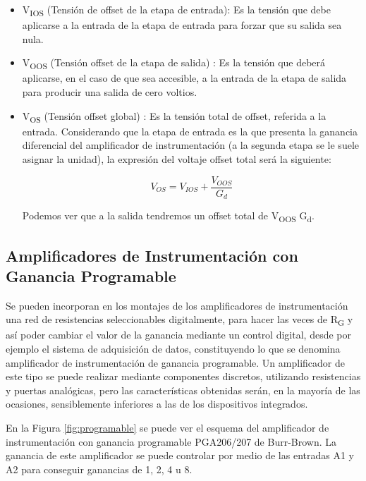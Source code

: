 \begin{itemize}
\item V\textsubscript{IOS} (Tensión de offset de la etapa de entrada): Es la tensión que debe aplicarse a la entrada de la etapa de entrada para forzar que su salida sea nula.
\item V\textsubscript{OOS} (Tensión offset de la etapa de salida) : Es la tensión que deberá aplicarse, en el caso de que sea accesible, a la entrada de la etapa de salida para producir una salida de cero voltios.
\item  V\textsubscript{OS} (Tensión offset global) : Es la tensión total de offset, referida a la entrada. Considerando que la etapa de entrada es la que presenta la ganancia diferencial del amplificador de instrumentación (a la segunda etapa se le suele asignar la unidad), la expresión del voltaje offset total será la siguiente:

\begin{equation}\label{eq7}
V_{OS} = V_{IOS} + \frac{V_{OOS}}{G_d}
\end{equation}

Podemos ver que a la salida tendremos un offset total de V\textsubscript{OOS} G\textsubscript{d}.
\end{itemize}



\subsection{Amplificadores de Instrumentación con Ganancia Programable} %
\label{ganancia_programable}

Se pueden incorporan en los montajes de los amplificadores de instrumentación una red de resistencias seleccionables digitalmente, para hacer las veces de R\textsubscript{G} y así poder cambiar el valor de la ganancia mediante un control digital, desde por ejemplo el sistema de adquisición de datos, constituyendo lo que se denomina amplificador de instrumentación de ganancia programable. Un amplificador de este tipo se puede realizar mediante componentes
discretos, utilizando resistencias y puertas analógicas, pero las características obtenidas serán, en la mayoría de las ocasiones, sensiblemente inferiores a las de los dispositivos integrados.

En la Figura \ref{fig:programable}  se puede ver el esquema del amplificador de instrumentación con ganancia programable PGA206/207 de Burr-Brown. La ganancia de este amplificador se puede controlar por medio de las entradas A1 y A2 para conseguir ganancias de 1, 2, 4 u 8.

